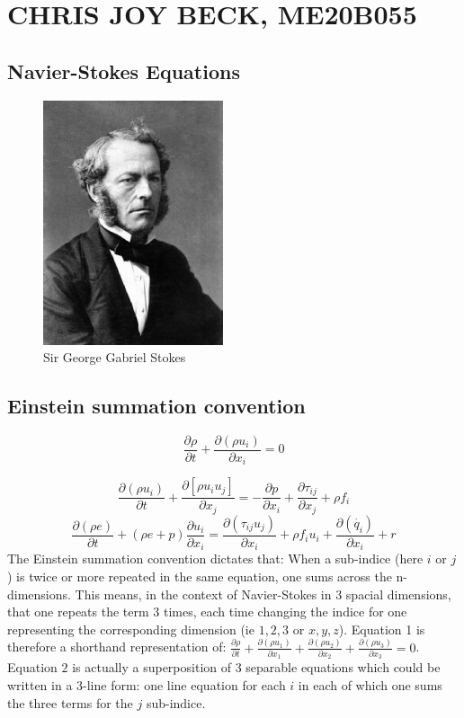 \section{CHRIS JOY BECK, ME20B055}	
\subsection{Navier-Stokes Equations}
\begin{figure}[h]
	\begin{center}
		\includegraphics[width=200px]{me20b055.eps}
	\end{center}
	\caption{Sir George Gabriel Stokes}
	\label{fig:revexp}
	\end{figure}

\subsection{Einstein summation convention}

\begin{equation}
\frac{\partial \rho}{\partial t} + \frac{\partial(\rho u_{i})}{\partial x_{i}} = 0
\end{equation}

\begin{equation}
\frac{\partial (\rho u_{i})}{\partial t} + \frac{\partial[\rho u_{i}u_{j}]}{\partial x_{j}} = -\frac{\partial p}{\partial x_{i}} + \frac{\partial \tau_{ij}}{\partial x_{j}} + \rho f_{i} \end{equation}
\begin{equation}
\frac{\partial (\rho e)}{\partial t} + (\rho e+p)\frac{\partial u_{i}}{\partial x_{i}} = \frac{\partial(\tau_{ij}u_{j})}{\partial x_{i}} + \rho f_{i}u_{i} + \frac{\partial(\dot{ q_{i}})}{\partial x_{i}} + r \end{equation}
The Einstein summation convention dictates that: When a sub-indice (here $i$ or $j$) is twice or more repeated in the same equation, one sums across the n-dimensions. 
This means, in the context of Navier-Stokes in 3 spacial dimensions, that one repeats the term 3 times, each time changing the indice for one representing the corresponding dimension (ie $1,2,3$ or $x,y,z$). Equation 1 is therefore a shorthand representation of: $\frac{\partial \rho}{\partial t}+\frac{\partial(\rho u_{1})}{\partial x_{1}}+\frac{\partial(\rho u_{2})}{\partial x_{2}}+ \frac{\partial(\rho u_{3})}{\partial x_{3}}=0$.
Equation $2$ is actually a superposition of 3 separable equations which could be written in a 3-line form: one line equation for each $i$ in each of which one sums the three terms for the $j$ sub-indice.
